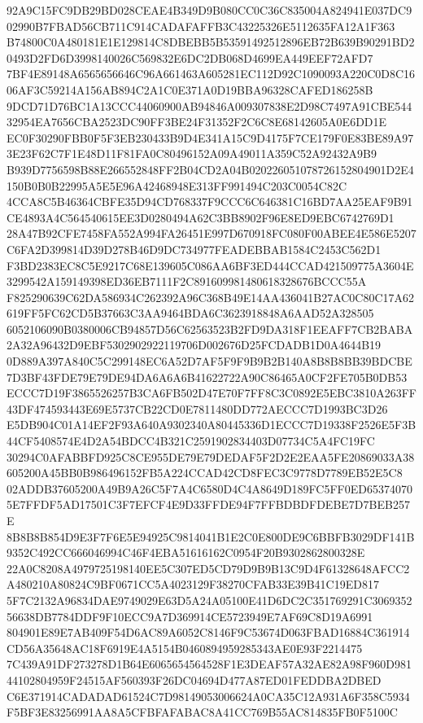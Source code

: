 \documentclass[UTF8,fontset=fandol,zihao=-4,a4paper]{ctexart}
\begin{document}
{{92A9C15FC9DB29BD028CEAE4B349D9B080CC0C36C835004A824941E037DC902990B7FBAD56CB711C914CADAFAFFB3C43225326E5112635FA12A1F363
B74800C0A480181E1E129814C8DBEBB5B53591492512896EB72B639B90291BD20493D2FD6D3998140026C569832E6DC2DB068D4699EA449EEF72AFD7
7BF4E89148A6565656646C96A661463A605281EC112D92C1090093A220C0D8C1606AF3C59214A156AB894C2A1C0E371A0D19BBA96328CAFED186258B
9DCD71D76BC1A13CCC44060900AB94846A009307838E2D98C7497A91CBE54432954EA7656CBA2523DC90FF3BE24F31352F2C6C8E68142605A0E6DD1E
EC0F30290FBB0F5F3EB230433B9D4E341A15C9D4175F7CE179F0E83BE89A973E23F62C7F1E48D11F81FA0C80496152A09A49011A359C52A92432A9B9
B939D7756598B88E266552848FF2B04CD2A04B020226051078726152804901D2E4150B0B0B22995A5E5E96A42468948E313FF991494C203C0054C82C
4CCA8C5B46364CBFE35D94CD768337F9CCC6C646381C16BD7AA25EAF9B91CE4893A4C564540615EE3D0280494A62C3BB8902F96E8ED9EBC6742769D1
28A47B92CFE7458FA552A994FA26451E997D670918FC080F00ABEE4E586E5207C6FA2D399814D39D278B46D9DC734977FEADEBBAB1584C2453C562D1
F3BD2383EC8C5E9217C68E139605C086AA6BF3ED444CCAD421509775A3604E3299542A159149398ED36EB7111F2C891609981480618328676BCCC55A
F825290639C62DA586934C262392A96C368B49E14AA436041B27AC0C80C17A62619FF5FC62CD5B37663C3AA9464BDA6C3623918848A6AAD52A328505
6052106090B0380006CB94857D56C62563523B2FD9DA318F1EEAFF7CB2BABA2A32A96432D9EBF5302902922119706D002676D25FCDADB1D0A4644B19
0D889A397A840C5C299148EC6A52D7AF5F9F9B9B2B140A8B8B8BB39BDCBE7D3BF43FDE79E79DE94DA6A6A6B41622722A90C86465A0CF2FE705B0DB53
ECCC7D19F3865526257B3CA6FB502D47E70F7FF8C3C0892E5EBC3810A263FF43DF474593443E69E5737CB22CD0E7811480DD772AECCC7D1993BC3D26
E5DB904C01A14EF2F93A640A9302340A80445336D1ECCC7D19338F2526E5F3B44CF5408574E4D2A54BDCC4B321C2591902834403D07734C5A4FC19FC
30294C0AFABBFD925C8CE955DE79E79DEDAF5F2D2E2EAA5FE20869033A38605200A45BB0B986496152FB5A224CCAD42CD8FEC3C9778D7789EB52E5C8
02ADDB37605200A49B9A26C5F7A4C6580D4C4A8649D189FC5FF0ED653740705E7FFDF5AD17501C3F7EFCF4E9D33FFDE94F7FFBDBDFDEBE7D7BEB257E
8B8B8B854D9E3F7F6E5E94925C9814041B1E2C0E800DE9C6BBFB3029DF141B9352C492CC666046994C46F4EBA51616162C0954F20B9302862800328E
22A0C8208A4979725198140EE5C307ED5CD79D9B9B13C9D4F61328648AFCC2A480210A80824C9BF0671CC5A4023129F38270CFAB33E39B41C19ED817
5F7C2132A96834DAE9749029E63D5A24A05100E41D6DC2C351769291C306935256638DB7784DDF9F10ECC9A7D369914CE5723949E7AF69C8D19A6991
804901E89E7AB409F54D6AC89A6052C8146F9C53674D063FBAD16884C361914CD56A35648AC18F6919E4A5154B0460894959285343AE0E93F2214475
7C439A91DF273278D1B64E6065654564528F1E3DEAF57A32AE82A98F960D98144102804959F24515AF560393F26DC04694D477A87ED01FEDDBA2DBED
C6E371914CADADAD61524C7D98149053006624A0CA35C12A931A6F358C5934F5BF3E83256991AA8A5CFBFAFABAC8A41CC769B55AC814835FB0F5100C
}}
\end{document}
